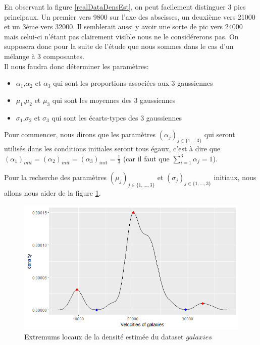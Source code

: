 \documentclass[a4paper,french,10pt]{article}
\begin{document}
En observant la figure \ref{realDataDensEst}, on peut facilement distinguer 3 pics principaux. Un premier vers 9800 sur l'axe des abscisses, un deuxième vers 21000 et un 3ème vers 32000. Il semblerait aussi y avoir une sorte de pic vers 24000 mais celui-ci n'étant pas clairement visible nous ne le considérerons pas. On supposera donc pour la suite de l'étude que nous sommes dans le cas d'un mélange à 3 composantes. \\
Il nous faudra donc déterminer les paramètres:
\begin{itemize}
	\item $\alpha_1$,$\alpha_2$ et $\alpha_3$ qui sont les proportions associées aux 3 gaussiennes
	\item $\mu_1$,$\mu_2$ et $\mu_3$ qui sont les moyennes des 3 gaussiennes
	\item $\sigma_1$,$\sigma_2$ et $\sigma_3$ qui sont les écarts-types des 3 gaussiennes
\end{itemize}
Pour commencer, nous dirons que les paramètres $(\alpha_{j})_{j \in \{1,\dots3\}}$ qui seront utilisés dans les conditions initiales seront tous égaux, c'est à dire que $(\alpha_1)_{init} = (\alpha_2)_{init} = (\alpha_3)_{init} = \frac{1}{3}$ (car il faut que $\sum_{i=1}^{3} \alpha_j = 1$).

\vspace{2mm}

Pour la recherche des paramètres $(\mu_j)_{j \in \{1,\dots,3\}}$ et $(\sigma_j)_{j \in \{1, \dots, 3\}}$ initiaux, nous allons nous aider de la figure \ref{extremumLoc}.

\begin{figure}[htp] 
	\centering
	\includegraphics[scale=0.6]{images/extremumLoc.png}
	\caption{Extremums locaux de la densité estimée du dataset $galaxies$}
	\label{extremumLoc}
\end{figure}
\end{document}
